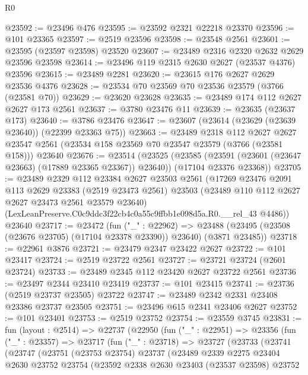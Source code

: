 \begin{lexlean}{R0}
\begin{coremodule}
@23592 := @23496 @476
@23595 := @23592 @2321 @22218 @23370
@23596 := @101 @23365
@23597 := @2519 @23596
@23598 := @23548 @2561
@23601 := @23595 (@23597 @23598) @23520
@23607 := @23489 @2316 @2320 @2632 @2629 @23596 @23598
@23614 := @23496 @119 @2315 @2630 @2627 (@23537 @4376) @23596
@23615 := @23489 @2281
@23620 := @23615 @176 @2627 @2629 @23536 @4376
@23628 := @23534 @70 @23569 @70 @23536 @23579 (@3766 (@23581 @70))
@23629 := @23620 @23628
@23635 := @23489 @174 @112 @2627 @2627 @173 @2561
@23637 := @3780 @23476 @11
@23639 := @23635 (@23637 @173)
@23640 := @3786 @23476
@23647 := @23607 (@23614 (@23629 (@23639 @23640)) (@22399 @23363 @75))
@23663 := @23489
    @2318
    @112
    @2627
    @2627
    @23547
    @2561
    (@23534 @158 @23569 @70 @23547 @23579 (@3766 (@23581 @158)))
    @23640
@23676 := @23514
    (@23525
      (@23585 (@23591 (@23601 (@23647 @23663) (@17889 @23365 @23367)) @23640))
      (@17104 @23376 @23368))
@23705 := @23489
    @2329
    @112
    @23384
    @2627
    @23503
    @2561
    (@17269
      @23476
      @2091
      @113
      @2629
      @23383
      (@2519 @23473 @2561)
      @23503
      (@23489 @110 @112 @2627 @2627 @23473 @2561 @23579 @23640)
      (LexLeanPreserve.C0c9ddc3f22cb4c0a55c9ffbb1e098d5a.R0.__rel_43 @4486))
    @23640
@23717 := @23472
    (fun ("_" : @22962) =>
    @23488 (@23495 (@23508 (@23676 @23705) (@17104 @23378 @23390)) @23640) (@3871 @23485))
@23718 := @22961 @3876
@23721 := @23479 @2347 @23422 @2627
@23722 := @101 @23417
@23724 := @2519 @23722 @2561
@23727 := @23721 @23724 (@2601 @23724)
@23733 := @23489 @2345 @112 @23420 @2627 @23722 @2561
@23736 := @23497 @2344 @23410 @23419
@23737 := @101 @23415
@23741 := @23736 (@2519 @23737 @23505) @23722
@23747 := @23489 @2342 @2331 @23408 @23386 @23737 @23505
@23751 := @23496 @615 @2341 @23406 @2627
@23752 := @101 @23401
@23753 := @2519 @23752
@23754 := @23559 @3745
@23831 := fun (layout : @2514) =>
  @22737
    (@22950
      (fun ("_" : @22951) =>
      @23356
        (fun ("_" : @23357) =>
        @23717
          (fun ("_" : @23718) =>
          @23727
            (@23733
              (@23741
                (@23747
                  (@23751
                    (@23753 @23754)
                    @23737
                    (@23489
                      @2339
                      @2275
                      @23404
                      @2630
                      @23752
                      @23754
                      (@23592
                        @2338
                        @2630
                        @23403
                        (@23537 @23598)
                        @23752

\end{coremodule}
\end{lexlean}
